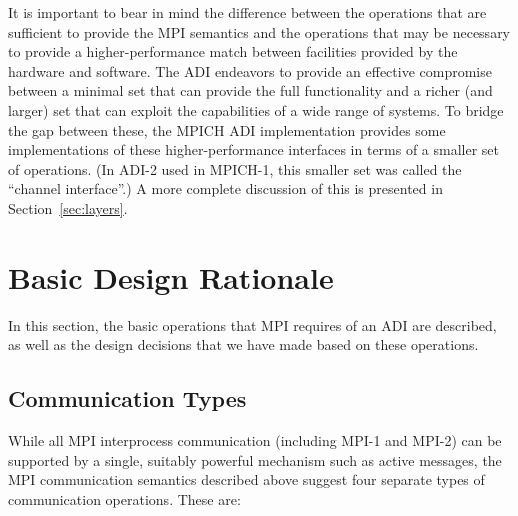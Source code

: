 It is important to bear in mind the difference between the operations that are
sufficient to provide the MPI semantics and the operations that may be
necessary to provide a higher-performance match between facilities
provided by the hardware and software.  The ADI endeavors to provide
an effective compromise between a minimal set that can provide the
full functionality and a richer (and larger) set that can exploit the
capabilities of a wide range of systems.  To bridge the gap between
these, the MPICH ADI implementation provides some implementations of
these higher-performance interfaces in terms of a smaller set of
operations.  (In ADI-2 used in MPICH-1, this smaller set was called
the ``channel interface''.)  A more complete discussion of this is
presented in Section~\ref{sec:layers}.

\section{Basic Design Rationale}
\label{sec:basic-design}
In this section, the basic operations that MPI requires of an ADI are
described, as well as the design decisions that we have made based on these
operations.

\subsection{Communication Types}
\label{sec:comm-types}

While all MPI interprocess communication (including MPI-1 and MPI-2)
can be supported by a single, suitably powerful mechanism such as
active messages, the MPI communication semantics described above
suggest four separate types of communication operations.  These are:

